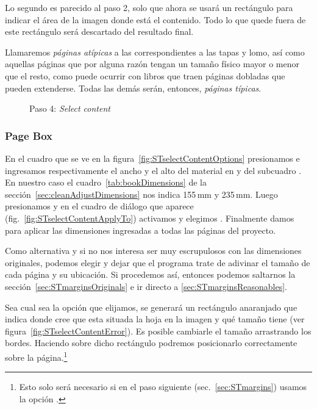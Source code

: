 \documentclass[%
	a5paper,
	10pt,
	twoside,
	openright,
	final,
]{memoir}
\begin{document}
	Lo segundo es parecido al paso 2, solo que ahora se usará un rectángulo para indicar el área de la imagen donde está el contenido. Todo lo que quede fuera de este rectángulo será descartado del resultado final.

	 Llamaremos \emph{páginas atípicas} a las correspondientes a las tapas y lomo, así como aquellas páginas que por alguna razón tengan un tamaño físico mayor o menor que el resto, como puede ocurrir con libros que traen páginas dobladas que pueden extenderse. Todas las demás serán, entonces, \emph{páginas típicas}.

	\begin{figure}
		\centering
		\hfill
		\caption{Paso 4: \emph{Select content}\label{fig:STselectContent}}
	\end{figure}

	\subsubsection{Page Box} En el cuadro  que se ve en la figura~\ref{fig:STselectContentOptions} presionamos  e ingresamos respectivamente el ancho y el alto del material en  y  del subcuadro . En nuestro caso el cuadro~\ref{tab:bookDimensions} de la sección~\ref{sec:cleanAdjustDimensions} nos indica 155\,mm y 235\,mm. Luego presionamos  y en el cuadro de diálogo que aparece (fig.~\ref{fig:STselectContentApplyTo}) activamos  y elegimos . Finalmente damos  para aplicar las dimensiones ingresadas a todas las páginas del proyecto.

	Como alternativa y si no nos interesa ser muy escrupulosos con las dimensiones originales, podemos elegir  y dejar que el programa trate de adivinar el tamaño de cada página y su ubicación. Si procedemos así, entonces podemos saltarnos la sección~\ref{sec:STmarginsOriginals} e ir directo a \ref{sec:STmarginsReasonables}.

	Sea cual sea la opción que elijamos, se generará un rectángulo anaranjado que indica donde \scantailor cree que esta situada la hoja en la imagen y qué tamaño tiene (ver figura~\ref{fig:STselectContentError}). Es posible cambiarle el tamaño arrastrando los bordes. Haciendo  sobre dicho rectángulo podremos posicionarlo correctamente sobre la página.\footnote{Esto solo será necesario si en el paso siguiente (sec.~\ref{sec:STmargins}) usamos la opción .}
\end{document}
